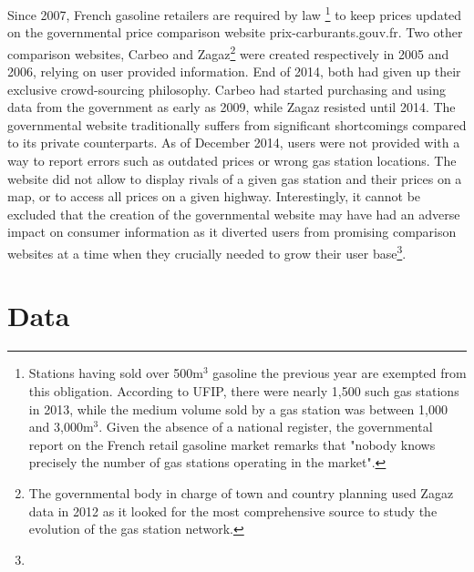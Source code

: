 \documentclass[english]{article}
\begin{document}
Since 2007, French gasoline retailers are required by law%
\footnote{Stations having sold over 500m$^{3}$ gasoline the previous year are exempted from this obligation. According to UFIP, there were nearly 1,500 such gas stations in 2013, while the medium volume sold by a gas station was between 1,000 and 3,000m$^{3}$. Given the absence of a national register, the governmental report \cite{BEL12} on the French retail gasoline market remarks that "nobody knows precisely the number of gas stations operating in the market".}%
to keep prices updated on the governmental price comparison website prix-carburants.gouv.fr. Two other comparison websites, Carbeo and Zagaz\footnote{The governmental body in charge of town and country planning used Zagaz data in 2012 as it looked for the most comprehensive source to study the evolution of the gas station network.} were created respectively in 2005 and 2006, relying on user provided information. End of 2014, both had given up their exclusive crowd-sourcing philosophy. Carbeo had started purchasing and using data from the government as early as 2009, while Zagaz resisted until 2014. The governmental website traditionally suffers from significant shortcomings compared to its private counterparts. As of December 2014, users were not provided with a way to report errors such as outdated prices or wrong gas station locations. The website did not allow to display rivals of a given gas station and their prices on a map, or to access all prices on a given highway. Interestingly, it cannot be excluded that the creation of the governmental website may have had an adverse impact on consumer information as it diverted users from promising comparison websites at a time when they crucially needed to grow their user base\footnote{}.


\section{Data}
\end{document}
